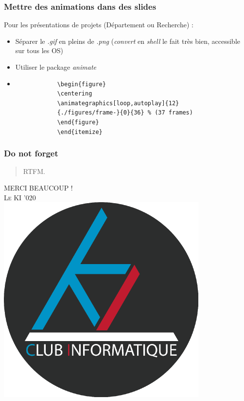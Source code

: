 \documentclass[handout]{beamer}
\begin{document}
\begin{frame}[fragile=singleslide]
	\frametitle{Mettre des animations dans des slides}
	\centering
	Pour les présentations de projets (Département ou Recherche) :\\
	\begin{itemize}
		\item Séparer le \textit{.gif} en pleins de \textit{.png} (\textit{convert} en \textit{shell} le fait très bien, accessible sur tous les OS)
		\item Utiliser le package \textit{animate}
		\item
			\begin{verbatim}
			\begin{figure}
		    \centering
		    \animategraphics[loop,autoplay]{12}
			{./figures/frame-}{0}{36} % (37 frames)
		    \end{figure}
			\end{itemize}
			\end{verbatim}
	\end{itemize}
\end{frame}

\begin{frame}
	\frametitle{Do not forget}
	\centering
	\begin{quote}
		RTFM.
	\end{quote}
\end{frame}

\begin{frame}
	\centering
	\Huge
	\textsc{MERCI BEAUCOUP !}\\
	\vspace*{2cm}
	\normalsize
	\textsc{Le KI '020}\\
	\vspace*{1cm}
	\centering
	\includegraphics[scale=0.2]{logo-ki.png}
\end{frame}
\end{document}
